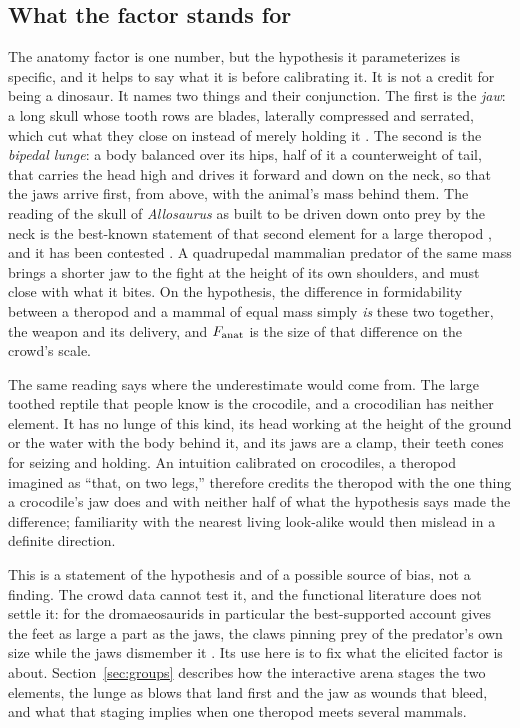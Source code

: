 \documentclass[11pt]{article}
\begin{document}
\subsection{What the factor stands for}
\label{sec:ontology}
The anatomy factor is one number, but the hypothesis it parameterizes is specific, and it helps to say what it is before calibrating it. It is not a credit for being a dinosaur. It names two things and their conjunction. The first is the \emph{jaw}: a long skull whose tooth rows are blades, laterally compressed and serrated, which cut what they close on instead of merely holding it \cite{torices2018puncture}. The second is the \emph{bipedal lunge}: a body balanced over its hips, half of it a counterweight of tail, that carries the head high and drives it forward and down on the neck, so that the jaws arrive first, from above, with the animal's mass behind them. The reading of the skull of \textit{Allosaurus} as built to be driven down onto prey by the neck is the best-known statement of that second element for a large theropod \cite{rayfield2001cranial}, and it has been contested \cite{frazzetta2002prey}. A quadrupedal mammalian predator of the same mass brings a shorter jaw to the fight at the height of its own shoulders, and must close with what it bites. On the hypothesis, the difference in formidability between a theropod and a mammal of equal mass simply \emph{is} these two together, the weapon and its delivery, and $F_{\rm anat}$ is the size of that difference on the crowd's scale.

The same reading says where the underestimate would come from. The large toothed reptile that people know is the crocodile, and a crocodilian has neither element. It has no lunge of this kind, its head working at the height of the ground or the water with the body behind it, and its jaws are a clamp, their teeth cones for seizing and holding. An intuition calibrated on crocodiles, a theropod imagined as ``that, on two legs,'' therefore credits the theropod with the one thing a crocodile's jaw does and with neither half of what the hypothesis says made the difference; familiarity with the nearest living look-alike would then mislead in a definite direction.

This is a statement of the hypothesis and of a possible source of bias, not a finding. The crowd data cannot test it, and the functional literature does not settle it: for the dromaeosaurids in particular the best-supported account gives the feet as large a part as the jaws, the claws pinning prey of the predator's own size while the jaws dismember it \cite{fowler2011predatory}. Its use here is to fix what the elicited factor is about. Section~\ref{sec:groups} describes how the interactive arena stages the two elements, the lunge as blows that land first and the jaw as wounds that bleed, and what that staging implies when one theropod meets several mammals.
\end{document}
